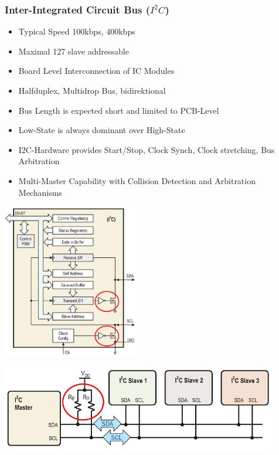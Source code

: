 \subsubsection{Inter-Integrated Circuit Bus ($I^2C$)}
\begin{minipage}{13cm}
	\begin{itemize}
		\item Typical Speed 100kbps, 400kbps
		\item Maximal 127 slave addressable
		\item Board Level Interconnection of IC Modules
		\item Halfduplex, Multidrop Bus, bidirektional
		\item Bus Length is expected short and limited to PCB-Level
		\item Low-State is always dominant over High-State
		\item I2C-Hardware provides Start/Stop, Clock Synch, Clock stretching, Bus Arbitration
		\item Multi-Master Capability with Collision Detection and Arbitration Mechanisms
	\end{itemize}
\end{minipage}
\begin{minipage}{6cm}
	\includegraphics[width=6cm]{images/i2c_internal.png}
\end{minipage}
\includegraphics[width=12cm]{images/i2c_1.png}
